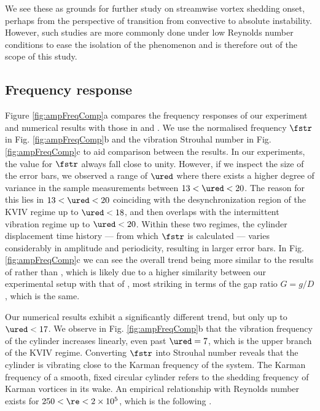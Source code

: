 \documentclass[a4paper,fleqn]{cas-sc}
\begin{document}
We see these as grounds for further study on streamwise vortex shedding onset, perhaps from the perspective of transition from convective to absolute instability. However, such studies are more commonly done under low Reynolds number conditions \citep{Wang2019,Li2019} to ease the isolation of the phenomenon and is therefore out of the scope of this study.

\subsection{Frequency response} \label{ssec:freResp}
Figure \ref{fig:ampFreqComp}a compares the frequency responses of our experiment and numerical results with those in \citet{Nguyen2012} and \citet{Koide2013}. We use the normalised frequency  $\fstr$ in Fig. \ref{fig:ampFreqComp}b and the vibration Strouhal number in Fig. \ref{fig:ampFreqComp}c to aid comparison between the results. In our experiments, the value for  $\fstr$ always fall close to unity. However, if we inspect the size of the error bars, we observed a range of  $\ured$ where there exists a higher degree of variance in the sample measurements between  $13 < \ured < 20$. The reason for this lies in  $13 < \ured < 20$ coinciding with the desynchronization region of the KVIV regime up to  $\ured < 18$, and then overlaps with the intermittent vibration regime up to  $\ured < 20$. Within these two regimes, the cylinder displacement time history --- from which  $\fstr$ is calculated --- varies considerably in amplitude and periodicity, resulting in larger error bars. In Fig. \ref{fig:ampFreqComp}c we can see the overall trend being more similar to the results of \citet{Koide2013} rather than \citet{Nguyen2012}, which is likely due to a higher similarity between our experimental setup with that of \citet{Koide2013}, most striking in terms of the gap ratio  $G = g/D$, which is the same.

Our numerical results exhibit a significantly different trend, but only up to  $\ured < 17$. We observe in Fig. \ref{fig:ampFreqComp}b that the vibration frequency of the cylinder increases linearly, even past  $\ured = 7$, which is the upper branch of the KVIV regime. Converting  $\fstr$ into Strouhal number reveals that the cylinder is vibrating close to the Karman frequency of the system. The Karman frequency of a smooth, fixed circular cylinder refers to the shedding frequency of Karman vortices in its wake. An empirical relationship with Reynolds number exists for  $250 < \re < 2 \times 10^{5}$, which is the following \citet{Blevins1990}.
\end{document}
